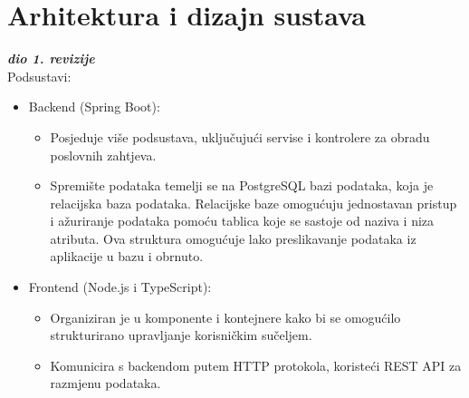 \chapter{Arhitektura i dizajn sustava}
		
		\textbf{\textit{dio 1. revizije}}\\
	
	Podsustavi:

\begin{itemize}
    \item Backend (Spring Boot):

\begin{itemize}
        \item Posjeduje više podsustava, uključujući servise i kontrolere za obradu poslovnih zahtjeva.
        \item Spremište podataka temelji se na PostgreSQL bazi podataka, koja je relacijska baza podataka. Relacijske baze omogućuju jednostavan pristup i ažuriranje podataka pomoću tablica koje se sastoje od naziva i niza atributa. Ova struktura omogućuje lako preslikavanje podataka iz aplikacije u bazu i obrnuto.
\end{itemize}

    \item Frontend (Node.js i TypeScript):

\begin{itemize}
        \item Organiziran je u komponente i kontejnere kako bi se omogućilo strukturirano upravljanje korisničkim sučeljem.
        \item Komunicira s backendom putem HTTP protokola, koristeći REST API za razmjenu podataka.
\end{itemize}

\end{itemize}


